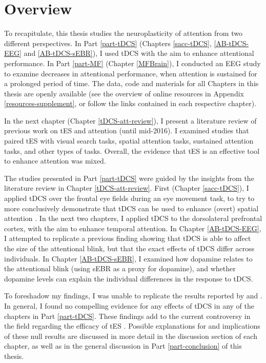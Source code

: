 \documentclass[11pt,]{memoir}
\begin{document}
\hypertarget{overview}{%
\section{Overview}\label{overview}}

To recapitulate, this thesis studies the neuroplasticity of attention from two different perspectives. In Part \ref{part-tDCS} (Chapters \ref{sacc-tDCS}, \ref{AB-tDCS-EEG} and \ref{AB-tDCS-sEBR}), I used tDCS with the aim to enhance attentional performance. In Part \ref{part-MF} (Chapter \ref{MFBrain}), I conducted an EEG study to examine decreases in attentional performance, when attention is sustained for a prolonged period of time. The data, code and materials for all Chapters in this thesis are openly available (see the overview of online resources in Appendix \ref{resources-supplement}, or follow the links contained in each respective chapter).

In the next chapter (Chapter \ref{tDCS-att-review}), I present a literature review of previous work on tES and attention (until mid-2016). I examined studies that paired tES with visual search tasks, spatial attention tasks, sustained attention tasks, and other types of tasks. Overall, the evidence that tES is an effective tool to enhance attention was mixed.

The studies presented in Part \ref{part-tDCS} were guided by the insights from the literature review in Chapter \ref{tDCS-att-review}. First (Chapter \ref{sacc-tDCS}), I applied tDCS over the frontal eye fields during an eye movement task, to try to more conclusively demonstrate that tDCS can be used to enhance (overt) spatial attention \autocite[in line with a previous study by][]{Kanai2012}. In the next two chapters, I applied tDCS to the dorsolateral prefrontal cortex, with the aim to enhance temporal attention. In Chapter \ref{AB-tDCS-EEG}, I attempted to replicate a previous finding \autocite{London2015} showing that tDCS is able to affect the size of the attentional blink, but that the exact effects of tDCS differ across individuals. In Chapter \ref{AB-tDCS-sEBR}, I examined how dopamine relates to the attentional blink (using sEBR as a proxy for dopamine), and whether dopamine levels can explain the individual differences in the response to tDCS.

To foreshadow my findings, I was unable to replicate the results reported by \textcite{Kanai2012} and \textcite{London2015}. In general, I found no compelling evidence for any effects of tDCS in any of the chapters in Part \ref{part-tDCS}. These findings add to the current controversy in the field regarding the efficacy of tES \autocites{Bestmann2017}{Heroux2017}{Horvath2015b}. Possible explanations for and implications of these null results are discussed in more detail in the discussion section of each chapter, as well as in the general discussion in Part \ref{part-conclusion} of this thesis.
\end{document}
